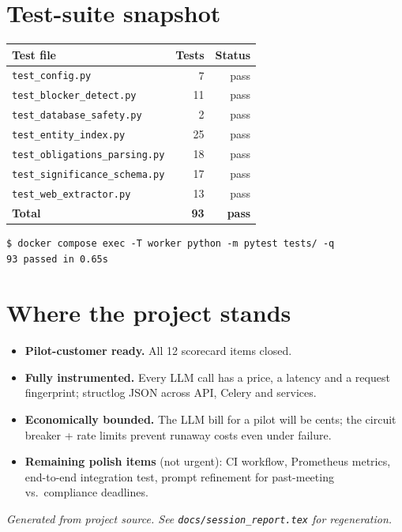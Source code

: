 \documentclass[11pt,a4paper]{article}
\begin{document}
\section{Test-suite snapshot}

\begin{center}
\small
\begin{tabular}{lrr}
\toprule
\textbf{Test file} & \textbf{Tests} & \textbf{Status} \\
\midrule
\texttt{test\_config.py}              & 7  & \textcolor{ok}{pass} \\
\texttt{test\_blocker\_detect.py}     & 11 & \textcolor{ok}{pass} \\
\texttt{test\_database\_safety.py}    & 2  & \textcolor{ok}{pass} \\
\texttt{test\_entity\_index.py}       & 25 & \textcolor{ok}{pass} \\
\texttt{test\_obligations\_parsing.py}& 18 & \textcolor{ok}{pass} \\
\texttt{test\_significance\_schema.py}& 17 & \textcolor{ok}{pass} \\
\texttt{test\_web\_extractor.py}      & 13 & \textcolor{ok}{pass} \\
\midrule
\textbf{Total}                         & \textbf{93} & \textbf{\textcolor{ok}{pass}} \\
\bottomrule
\end{tabular}
\end{center}

\begin{lstlisting}[style=output]
$ docker compose exec -T worker python -m pytest tests/ -q
93 passed in 0.65s
\end{lstlisting}

\section{Where the project stands}

\begin{itemize}[leftmargin=1.4em,itemsep=2pt]
  \item \textbf{Pilot-customer ready.} All 12 scorecard items closed.
  \item \textbf{Fully instrumented.} Every LLM call has a price, a
        latency and a request fingerprint; structlog JSON across
        API, Celery and services.
  \item \textbf{Economically bounded.} The LLM bill for a pilot will
        be cents; the circuit breaker + rate limits prevent runaway
        costs even under failure.
  \item \textbf{Remaining polish items} (not urgent): CI workflow,
        Prometheus metrics, end-to-end integration test, prompt
        refinement for past-meeting vs.\ compliance deadlines.
\end{itemize}

\vspace{0.5cm}
\begin{center}
\small\itshape
Generated from project source. See
\texttt{docs/session\_report.tex} for regeneration.
\end{center}
\end{document}
